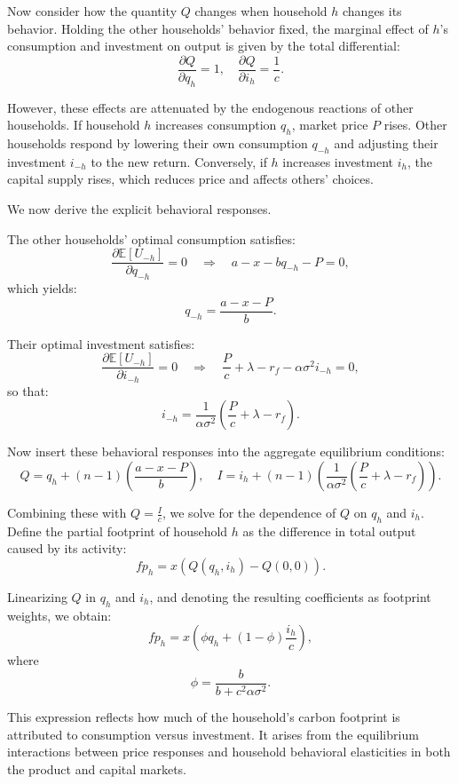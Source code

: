 \documentclass[12pt,a4paper]{article}
\begin{document}
Now consider how the quantity \( Q \) changes when household \( h \) changes its behavior. Holding the other households' behavior fixed, the marginal effect of \( h \)'s consumption and investment on output is given by the total differential:
\[
\frac{\partial Q}{\partial q_h} = 1, \quad \frac{\partial Q}{\partial i_h} = \frac{1}{c}.
\]

However, these effects are attenuated by the endogenous reactions of other households. If household \( h \) increases consumption \( q_h \), market price \( P \) rises. Other households respond by lowering their own consumption \( q_{-h} \) and adjusting their investment \( i_{-h} \) to the new return. Conversely, if \( h \) increases investment \( i_h \), the capital supply rises, which reduces price and affects others' choices.

We now derive the explicit behavioral responses.

The other households' optimal consumption satisfies:
\[
\frac{\partial \mathbb{E}[U_{-h}]}{\partial q_{-h}} = 0 \quad \Rightarrow \quad a - x - b q_{-h} - P = 0,
\]
which yields:
\[
q_{-h} = \frac{a - x - P}{b}.
\]

Their optimal investment satisfies:
\[
\frac{\partial \mathbb{E}[U_{-h}]}{\partial i_{-h}} = 0 \quad \Rightarrow \quad \frac{P}{c} + \lambda - r_f - \alpha \sigma^2 i_{-h} = 0,
\]
so that:
\[
i_{-h} = \frac{1}{\alpha \sigma^2} \left( \frac{P}{c} + \lambda - r_f \right).
\]

Now insert these behavioral responses into the aggregate equilibrium conditions:
\[
Q = q_h + (n - 1) \left( \frac{a - x - P}{b} \right), \quad I = i_h + (n - 1) \left( \frac{1}{\alpha \sigma^2} \left( \frac{P}{c} + \lambda - r_f \right) \right).
\]

Combining these with \( Q = \frac{I}{c} \), we solve for the dependence of \( Q \) on \( q_h \) and \( i_h \). Define the partial footprint of household \( h \) as the difference in total output caused by its activity:
\[
fp_h = x \left( Q(q_h, i_h) - Q(0, 0) \right).
\]

Linearizing \( Q \) in \( q_h \) and \( i_h \), and denoting the resulting coefficients as footprint weights, we obtain:
\[
fp_h = x \left( \phi q_h + (1 - \phi) \frac{i_h}{c} \right),
\]
where
\[
\phi = \frac{b}{b + c^2 \alpha \sigma^2}.
\]

This expression reflects how much of the household’s carbon footprint is attributed to consumption versus investment. It arises from the equilibrium interactions between price responses and household behavioral elasticities in both the product and capital markets.
\end{document}
